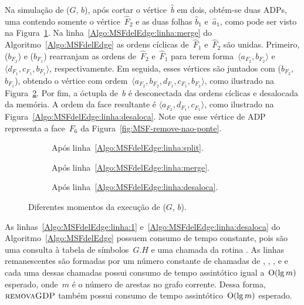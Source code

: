 Na simulação de \MSFdelEdge($G$, $b$), após cortar o vértice~$\hat b$ em dois, obtém-se duas ADPs, uma contendo somente o vértice~$\hat F_2$ e as duas folhas $\hat b_1$ e~$\hat a_1$, como pode ser visto na Figura~\ref{fig:MSF-remove-aresta-ex-1}.
Na linha~\ref{Algo:MSFdelEdge:linha:merge} do Algoritmo~\ref{Algo:MSFdelEdge} as ordens cíclicas de~$\hat F_1$ e~$\hat F_2$ são unidas.
Primeiro, \LCOCycle($b_{F_2}$) e \LCOCycle($b_{F_1}$) rearranjam as ordens de~$\hat F_2$ e~$\hat F_1$ para terem forma~$\langle  a_{F_2}, b_{F_2} \rangle$ e~$\langle d_{F_1}, c_{F_1}, b_{F_1}\rangle$, respectivamente.
Em seguida, esses vértices são juntados com \LCOMerge($b_{F_2}$, $b_{F_1}$), obtendo o vértice com ordem~$\langle a_{F_2}, b_{F_2}, d_{F_1}, c_{F_1}, b_{F_1}\rangle$, como ilustrado na Figura~\ref{fig:MSF-remove-aresta-ex-2}.
Por fim, a óctupla de~$b$ é desconectada das ordens cíclicas e desalocada da memória.
A ordem da face resultante é $\langle a_{F_2}, d_{F_1}, c_{F_1}\rangle$, como ilustrado na Figura~\ref{Algo:MSFdelEdge:linha:desaloca}.
Note que esse vértice de ADP representa a face~$F_6$ da Figura~\ref{fig:MSF-remove-nao-ponte}. 

\begin{figure}[h!]
\hspace{-1cm}
\begin{subfigure}{.2\textwidth}

\caption{Após linha~\ref{Algo:MSFdelEdge:linha:split}.}
\label{fig:MSF-remove-aresta-ex-1}
\end{subfigure}
\hspace{2cm}
\begin{subfigure}{.2\textwidth}

\caption{Após linha~\ref{Algo:MSFdelEdge:linha:merge}.}
\label{fig:MSF-remove-aresta-ex-2}
\end{subfigure}
\hspace{2cm}
\begin{subfigure}{.2\textwidth}

\caption{Após linha~\ref{Algo:MSFdelEdge:linha:desaloca}.}
\label{fig:MSF-remove-aresta-ex-3}
\end{subfigure}
\caption{Diferentes momentos da execução de \MSFdelEdge($G$, $b$).}
\label{fig:MSF-remocao-b}
\end{figure}


As linhas~\ref{Algo:MSFdelEdge:linha:1} e~\ref{Algo:MSFdelEdge:linha:desaloca} do Algoritmo~\ref{Algo:MSFdelEdge} possuem consumo de tempo constante, pois são uma consulta à tabela de símbolos~$G.H$ e uma chamada da rotina \LCODestroyOcto{}.
As linhas remanescentes são formadas por um número constante de chamadas de \LCOFindNode, \LCOCycle{}, \LCOMerge{}, \LCOSplit{} e \MSFupdate{} e cada uma dessas chamadas possui consumo de tempo assintótico igual a~$\mathrm{O}(\lg m)$ esperado, onde~$m$ é o número de arestas no grafo corrente.
Dessa forma, $\text{\scshape removaGDP}$ também possui consumo de tempo assintótico~$\mathrm{O}(\lg m)$ esperado.



